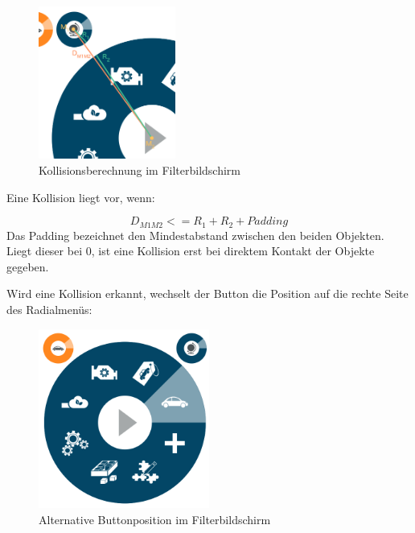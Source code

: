 \begin{figure}[H]
 \centering
 \includegraphics[width=0.4\textwidth]{grafiken/radius.png}
 \caption{Kollisionsberechnung im Filterbildschirm}
 \label{fig:collisionFilter}
\end{figure}
Eine Kollision liegt vor, wenn:\par
\begin{equation}
	D_{M1M2} <= R_1 + R_2 + Padding
\end{equation}
Das Padding bezeichnet den Mindestabstand zwischen den beiden Objekten. Liegt dieser bei 0, ist eine Kollision erst bei direktem Kontakt der Objekte gegeben.\par
Wird eine Kollision erkannt, wechselt der Button die Position auf die rechte Seite des Radialmenüs:
\begin{figure}[H]
 \centering
 \includegraphics[width=0.5\textwidth]{grafiken/fix_filter.png}
 \caption{Alternative Buttonposition im Filterbildschirm}
 \label{fig:fixFilter}
\end{figure}